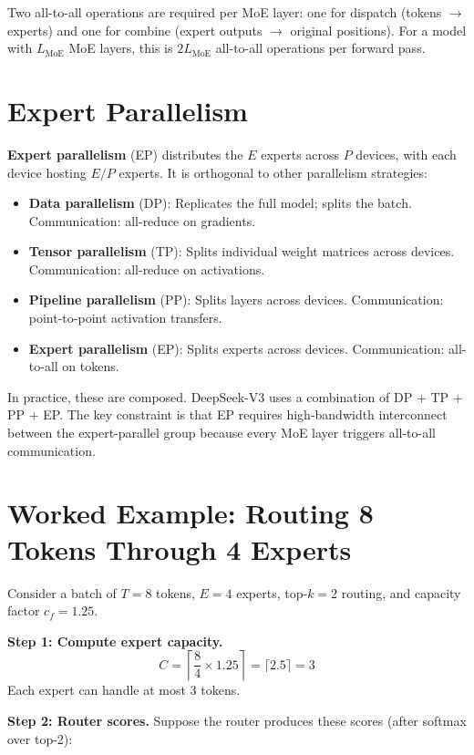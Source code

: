 Two all-to-all operations are required per MoE layer: one for dispatch (tokens $\to$ experts) and one for combine (expert outputs $\to$ original positions). For a model with $L_{\text{MoE}}$ MoE layers, this is $2 L_{\text{MoE}}$ all-to-all operations per forward pass.

\section{Expert Parallelism}
\label{ch:13:sec:expert_par}

\textbf{Expert parallelism} (EP) distributes the $E$ experts across $P$ devices, with each device hosting $E/P$ experts. It is orthogonal to other parallelism strategies:

\begin{itemize}
  \item \textbf{Data parallelism} (DP): Replicates the full model; splits the batch. Communication: all-reduce on gradients.
  \item \textbf{Tensor parallelism} (TP): Splits individual weight matrices across devices. Communication: all-reduce on activations.
  \item \textbf{Pipeline parallelism} (PP): Splits layers across devices. Communication: point-to-point activation transfers.
  \item \textbf{Expert parallelism} (EP): Splits experts across devices. Communication: all-to-all on tokens.
\end{itemize}

In practice, these are composed. DeepSeek-V3 uses a combination of DP + TP + PP + EP. The key constraint is that EP requires high-bandwidth interconnect between the expert-parallel group because every MoE layer triggers all-to-all communication.

\section{Worked Example: Routing 8 Tokens Through 4 Experts}
\label{ch:13:sec:example}

Consider a batch of $T = 8$ tokens, $E = 4$ experts, top-$k = 2$ routing, and capacity factor $c_f = 1.25$.

\textbf{Step 1: Compute expert capacity.}
\[
C = \left\lceil \frac{8}{4} \times 1.25 \right\rceil = \lceil 2.5 \rceil = 3
\]
Each expert can handle at most 3 tokens.

\textbf{Step 2: Router scores.}
Suppose the router produces these scores (after softmax over top-2):

